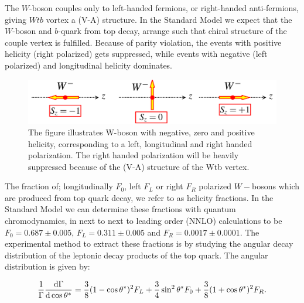 \documentclass[12pt,a4paper]{article}
\numberwithin{equation}{section}
\begin{document}
The $W$-boson couples only to left-handed fermions, or right-handed
anti-fermions, giving $Wtb$ vortex a (V-A) structure. In the Standard Model we
expect that the $W$-boson and $b$-quark from top decay, arrange such that chiral
structure of the couple vertex is fulfilled. Because of parity violation, the
events with positive helicity (right polarized) gets suppressed, while events
with negative (left polarized) and longitudinal helicity dominates.

\begin{figure}[H]
	\includegraphics[width=\linewidth]{figures/w_polarization.png}
	\caption{The figure illustrates W-boson with negative, zero and positive
    helicity, corresponding to a left, longitudinal and right handed
    polarization. The right handed polarization will be heavily suppressed
    because of the (V-A) structure of the Wtb vertex.}\label{fig:polarization}
\end{figure}

The fraction of; longitudinally $F_0$, left $F_L$ or right $F_R$ polarized
$W-$bosons which are produced from top quark decay, we refer to as helicity
fractions. In the Standard Model we can determine these fractions with quantum
chromodynamics, in next to next to leading order (NNLO) calculations to be
$F_0 = 0.687 \pm 0.005$, $F_L = 0.311 \pm 0.005$ and
$F_R = 0.0017 \pm 0.0001$\cite{Czarnecki_2010}. The experimental method to
extract these fractions is by studying the angular decay distribution of the
leptonic decay products of the top quark. The angular distribution is given by:

\begin{equation}
  \frac{1}{\Gamma}\dv{\Gamma}{\cos \theta^*} = \frac{3}{8}(1-\cos \theta^*)^2 F_L +
  \frac{3}{4}\sin^2 \theta^* F_0 + \frac{3}{8}(1+\cos \theta^*)^2 F_R.
\end{equation}
\end{document}
